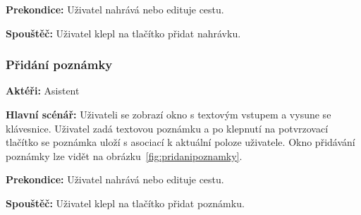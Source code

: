 \documentclass{article}
\newcommand{\usecase}[2]{\subsubsection{#1}\label{#2}}
\begin{document}
\vspace{0.1cm}
\noindent
\textbf{Prekondice:} Uživatel nahrává nebo edituje cestu.

\vspace{0.1cm}
\noindent
\textbf{Spouštěč:} Uživatel klepl na tlačítko přidat nahrávku.




\usecase{Přidání poznámky}{pridanipoznamky}
\textbf{Aktéři:} Asistent

\vspace{0.1cm}
\noindent
\textbf{Hlavní scénář:} Uživateli se zobrazí okno s textovým vstupem a vysune se klávesnice. Uživatel
zadá textovou poznámku a po klepnutí na potvrzovací tlačítko se poznámka uloží s asociací k aktuální poloze
uživatele. Okno přidávání poznámky lze vidět na obrázku~\ref{fig:pridanipoznamky}.

\vspace{0.1cm}
\noindent
\textbf{Prekondice:} Uživatel nahrává nebo edituje cestu.

\vspace{0.1cm}
\noindent
\textbf{Spouštěč:} Uživatel klepl na tlačítko přidat poznámku.
\end{document}
